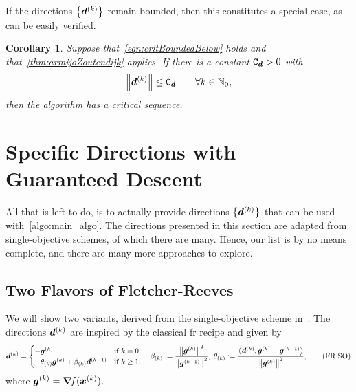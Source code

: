 \documentclass{article}
\theoremstyle{plain}
\newtheorem{corollary}[theorem]{Corollary}
\theoremstyle{definition}
\begin{document}
If the directions $\left\{\bm{d}^{(k)}\right\}$ remain bounded, then
this constitutes a special case, as can be easily verified.
\begin{corollary}%
	\label{thm:dirsBoundedConvergence}
	Suppose that~\eqref{eqn:critBoundedBelow} holds and 
	that~\cref{thm:armijoZoutendijk} applies.
	If there is a constant $\mathtt C_{\bm{d}} > 0$ with 
	$$
	\left\|\bm{d}^{(k)}\right\| \leq \mathtt C_{\bm{d}}
	\qquad \forall k \in \mathbb N_0,
	$$
	then the algorithm has a critical sequence.
\end{corollary}

\section{Specific Directions with Guaranteed Descent}

All that is left to do, is to actually provide directions $\left\{\bm{d}^{(k)}\right\}$ that
can be used with~\cref{algo:main_algo}.
The directions presented in this section are adapted from single-objective schemes,
of which there are many.
Hence, our list is by no means complete, and there are many more approaches to explore.

\subsection{Two Flavors of Fletcher-Reeves}
We will show two variants, derived from 
the single-objective scheme in~\cite{zhangGlobalConvergenceModified2006}.
The directions $\bm{d}^{(k)}$ are inspired by the
classical \ac{fr} recipe and given by
\begin{equation}
	\bm{d}^{(k)} = 
	\begin{cases}
		-\bm{g}^{(k)}
		&\text{if $k=0$},
		\\
		-\theta_{(k)}\bm{g}^{(k)}
		+ 
		\beta_{(k)}
		\bm{d}^{(k-1)}
		&\text{if $k\geq 1$,}
	\end{cases}
	\quad
	\beta_{(k)}
	:= 
	\frac{\left\|\bm{g}^{(k)}\right\|^2}{\left\|\bm{g}^{(k-1)}\right\|^2},
	\;
	\theta_{(k)}
	:=
	\frac{
		\left\langle \bm{d}^{(k)}, \bm{g}^{(k)} - \bm{g}^{(k-1)} \right\rangle
		}{
			\left\|\bm{g}^{(k)}\right\|^2
		},
		\tag{FR~SO}
		\label{eqn:frSO}
\end{equation}
where $\bm{g}^{(k)} = \bm{\nabla}\!f(\bm{x}^{(k)})$.
\end{document}

